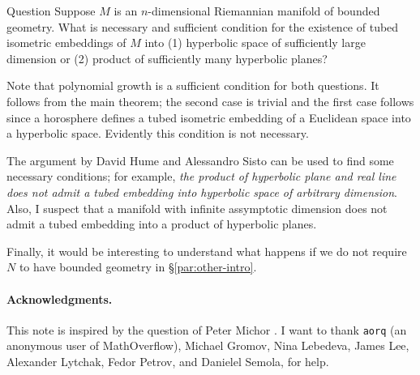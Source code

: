 \documentclass[a4paper,10pt]{article}
\begin{document}
\begin{thm}{Question}
Suppose $M$ is an $n$-dimensional Riemannian manifold of bounded geometry.
What is necessary and sufficient condition for the existence of tubed isometric embeddings of $M$
into (1) hyperbolic space of sufficiently large dimension or (2) product of sufficiently many hyperbolic planes?
\end{thm}

Note that polynomial growth is a sufficient condition for both questions.
It follows from the main theorem; the second case is trivial and the first case follows 
since a horosphere defines a tubed isometric embedding of a Euclidean space into a hyperbolic space.
Evidently this condition is not necessary.

The argument by David Hume and Alessandro Sisto \cite[1.1]{hume-sisto} can be used to find some necessary conditions; for example, \textit{the product of hyperbolic plane and real line does not admit a tubed embedding into hyperbolic space of arbitrary dimension}.
Also, I suspect that a manifold with infinite assymptotic dimension does not admit a tubed embedding into a product of hyperbolic planes.

Finally, it would be interesting to understand what happens if we do not require $N$ to have bounded geometry in §\ref{par:other-intro}. 

\paragraph{Acknowledgments.} 
This note is inspired by the question of Peter Michor \cite{124840}.
I want to thank 
\texttt{aorq} (an anonymous user of MathOverflow),
Michael Gromov,
Nina Lebedeva,
James Lee,
Alexander Lytchak, 
Fedor Petrov,
and
Danielel Semola,
for help.


{\sloppy
\def\emph{\textit}
\printbibliography[heading=bibintoc]
\fussy
}
\end{document}
